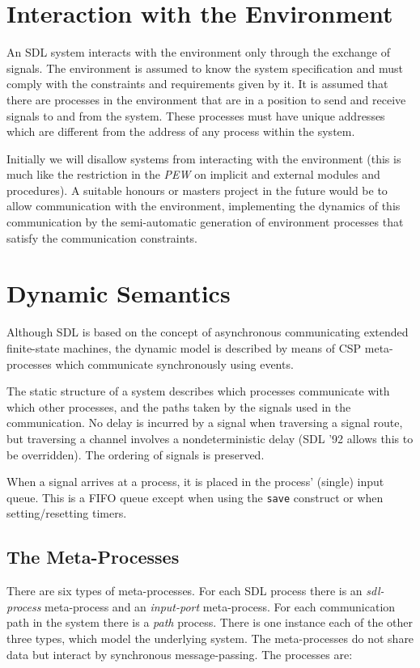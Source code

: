 \section{Interaction with the Environment}

An SDL system interacts with the environment only through the
exchange of signals. 
The environment is assumed to know the system specification and
must comply with the constraints and requirements
given by it. 
It is assumed that there are processes in the environment that 
are in a position to send and receive signals to and from the system.
These processes must have unique addresses which are
different from the address of any process within the system.

Initially we will disallow systems from interacting with the
environment (this is much like the restriction in the {\em PEW} on
implicit and external modules and procedures).
A suitable honours or masters project in the future would be to
allow communication with the environment, implementing the dynamics 
of this communication by the semi-automatic generation of environment
processes that satisfy the communication constraints.

\section{Dynamic Semantics}

Although SDL is based on the concept of asynchronous communicating
extended finite-state machines, the dynamic model is described by
means of CSP meta-processes which communicate synchronously using events.

The static structure of a system describes which processes
communicate with which other processes, and the paths taken by
the signals used in the communication.
No delay is incurred by a signal when traversing a signal
route, but traversing a channel involves a nondeterministic delay
(SDL '92 allows this to be overridden).
The ordering of signals is preserved.

When a signal arrives at a process, it is placed in the process'
(single) input queue. 
This is a FIFO queue except when using the {\tt save}
construct or when setting/resetting timers.

\subsection{The Meta-Processes}

There are six types of meta-processes.
For each SDL process there is an {\em sdl-process} meta-process
and an {\em input-port} meta-process. 
For each communication path in the system there is a {\em path} process.
There is one instance each of the other three types, which model
the underlying system.
The meta-processes do not share data but interact by synchronous
message-passing. 
The processes are:

